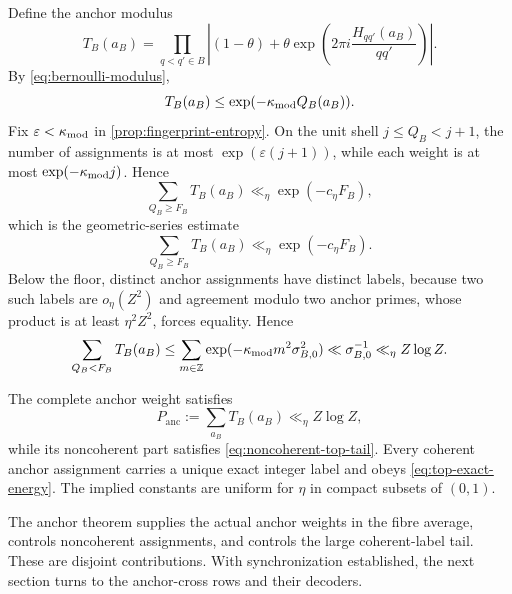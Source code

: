 Define the anchor modulus
\[
 T_B(a_B)=
 \prod_{q<q'\in B}
 \left|(1-\theta)+\theta
 \exp\left(2\pi i\frac{H_{qq'}(a_B)}{qq'}\right)\right|.
\]
By \cref{eq:bernoulli-modulus},
\[
 T_B(a_B)\leq\exp(-\kappa_{\rm mod}Q_B(a_B)).
\]
Fix $\varepsilon<\kappa_{\rm mod}$ in \cref{prop:fingerprint-entropy}.  On the unit shell $j\leq Q_B<j+1$, the number of assignments is at most $\exp(\varepsilon(j+1))$, while each weight is at most $\exp(-\kappa_{\rm mod}j)$.  Hence
\[
 \sum_{Q_B\geq F_B}T_B(a_B)
 \ll_{\eta}\exp(-c_\eta F_B),
\]
which is the geometric-series estimate
\begin{equation}
\label{eq:noncoherent-top-tail}
 \sum_{Q_B\geq F_B}T_B(a_B)
 \ll_{\eta}\exp(-c_\eta F_B).
\end{equation}
Below the floor, distinct anchor assignments have distinct labels, because two such labels are $o_\eta(Z^2)$ and agreement modulo two anchor primes, whose product is at least $\eta^2Z^2$, forces equality.  Hence
\[
 \sum_{Q_B<F_B}T_B(a_B)
 \leq\sum_{m\in\mathbb Z}
 \exp(-\kappa_{\rm mod}m^2\sigma_{B,0}^2)
 \ll\sigma_{B,0}^{-1}
 \ll_\eta Z\log Z.
\]

\begin{proposition}
\label{prop:top-partition}
The complete anchor weight satisfies
\begin{equation}
\label{eq:P-top}
 P_{\mathrm{anc}}:=\sum_{a_B}T_B(a_B)
 \ll_\eta Z\log Z,
\end{equation}
while its noncoherent part satisfies \cref{eq:noncoherent-top-tail}.  Every coherent anchor assignment carries a unique exact integer label and obeys \cref{eq:top-exact-energy}.  The implied constants are uniform for $\eta$ in compact subsets of $(0,1)$.
\end{proposition}

The anchor theorem supplies the actual anchor weights in the fibre average, controls noncoherent assignments, and controls the large coherent-label tail.  These are disjoint contributions.  With synchronization established, the next section turns to the anchor-cross rows and their decoders.
